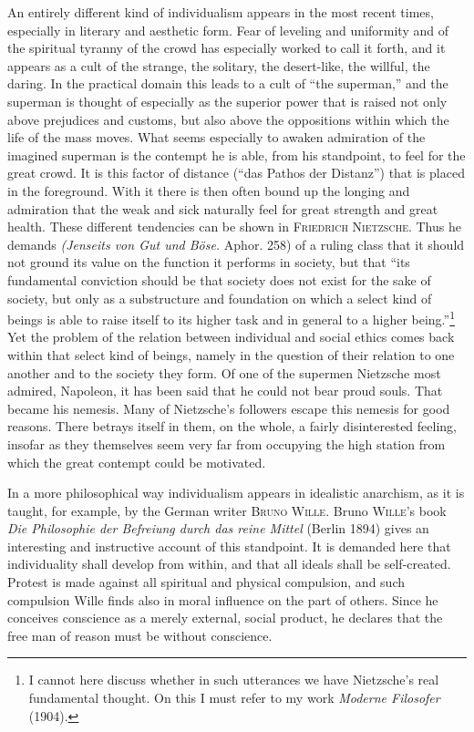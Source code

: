 \documentclass[12pt,a4paper,openany]{book}
\newcommand{\opage}[1]{\marginnote{\footnotesize\textit{[#1]}}}
\begin{document}
An entirely different kind of individualism appears in the most recent times, especially in literary and
aesthetic form. Fear of leveling and uniformity and of the spiritual tyranny of the crowd has especially worked
to call it forth, and it appears as a cult of the strange, the solitary, the desert-like, the willful, the
daring. In the practical domain this leads to a cult of ``the superman,'' and the superman is thought of
especially as the superior power that is raised not only above prejudices and customs, but also above the
oppositions within which the life of the mass moves. What seems especially to awaken admiration of the
imagined superman is the contempt he is able, from his standpoint, to feel for the great crowd. It is this
factor of distance (``das Pathos der Distanz'') that is placed in the foreground. With it there is then often
bound up the longing and admiration that the weak and sick naturally feel for great strength and great health.
These different
\opage{164}tendencies can be shown in \textsc{Friedrich Nietzsche}. Thus he demands \textit{(Jenseits von Gut und
Böse.} Aphor. 258) of a ruling class that it should not ground its value on the function it performs in
society, but that ``its fundamental conviction should be that society does not exist for the sake of
society, but only as a substructure and foundation on which a select kind of beings is able to raise itself
to its higher task and in general to a higher being.''\footnote[1]{I cannot here discuss whether in such
utterances we have Nietzsche's real fundamental thought. On this I must refer to my work \textit{Moderne
Filosofer} (1904).} Yet the problem of the relation between individual and social ethics comes back within
that select kind of beings, namely in the question of their relation to one another and to the society they
form. Of one of the supermen Nietzsche most admired, Napoleon, it has been said that he could not bear proud
souls. That became his nemesis. Many of Nietzsche's followers escape this nemesis for good reasons. There
betrays itself in them, on the whole, a fairly disinterested feeling, insofar as they themselves seem very
far from occupying the high station from which the great contempt could be motivated.

In a more philosophical way individualism appears in idealistic anarchism, as it is taught, for example, by
the German writer \textsc{Bruno Wille}. Bruno \textsc{Wille}'s book \textit{Die Philosophie der Befreiung durch
das reine Mittel} (Berlin 1894) gives an interesting and instructive account of this standpoint. It is
demanded here that individuality shall develop from within, and that all ideals shall be self-created.
Protest is made against all spiritual and physical compulsion, and such compulsion Wille finds also in moral
influence on the part of others. Since he conceives conscience as a merely external, social product, he
declares that the free man of reason must be without conscience.
\end{document}

